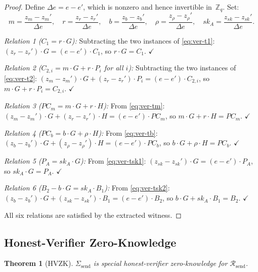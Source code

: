 \documentclass[11pt]{article}
\newtheorem{theorem}{Theorem}[section]
\theoremstyle{definition}
\newcommand{\Zq}{\mathbb{Z}_q}
\newcommand{\sk}{\mathit{sk}}
\begin{document}
\begin{proof}
  Define $\Delta e = e - e'$, which is nonzero and hence invertible
  in~$\Zq$.  Set:
  \[
    m = \frac{z_m - z_m'}{\Delta e},\quad
    r = \frac{z_r - z_r'}{\Delta e},\quad
    b = \frac{z_b - z_b'}{\Delta e},\quad
    \rho = \frac{z_\rho - z_\rho'}{\Delta e},\quad
    \sk_A = \frac{z_{\sk} - z_{\sk}'}{\Delta e}.
  \]

  \medskip\noindent\textit{Relation 1 ($C_1 = r \cdot G$):}
  Subtracting the two instances of \cref{eq:ver-t1}:
  $(z_r - z_r') \cdot G = (e - e') \cdot C_1$,
  so $r \cdot G = C_1$. $\checkmark$

  \medskip\noindent\textit{Relation 2 ($C_{2,i} = m \cdot G + r \cdot P_i$ for all $i$):}
  Subtracting the two instances of \cref{eq:ver-t2}:
  $(z_m - z_m') \cdot G + (z_r - z_r') \cdot P_i = (e - e') \cdot C_{2,i}$,
  so $m \cdot G + r \cdot P_i = C_{2,i}$. $\checkmark$

  \medskip\noindent\textit{Relation 3 ($\mathit{PC}_m = m \cdot G + r \cdot H$):}
  From \cref{eq:ver-tm}:
  $(z_m - z_m') \cdot G + (z_r - z_r') \cdot H = (e - e') \cdot \mathit{PC}_m$,
  so $m \cdot G + r \cdot H = \mathit{PC}_m$. $\checkmark$

  \medskip\noindent\textit{Relation 4 ($\mathit{PC}_b = b \cdot G + \rho \cdot H$):}
  From \cref{eq:ver-tb}:
  $(z_b - z_b') \cdot G + (z_\rho - z_\rho') \cdot H = (e - e') \cdot \mathit{PC}_b$,
  so $b \cdot G + \rho \cdot H = \mathit{PC}_b$. $\checkmark$

  \medskip\noindent\textit{Relation 5 ($P_A = \sk_A \cdot G$):}
  From \cref{eq:ver-tsk1}:
  $(z_{\sk} - z_{\sk}') \cdot G = (e - e') \cdot P_A$,
  so $\sk_A \cdot G = P_A$. $\checkmark$

  \medskip\noindent\textit{Relation 6 ($B_2 - b \cdot G = \sk_A \cdot B_1$):}
  From \cref{eq:ver-tsk2}:
  $(z_b - z_b') \cdot G + (z_{\sk} - z_{\sk}') \cdot B_1
   = (e - e') \cdot B_2$,
  so $b \cdot G + \sk_A \cdot B_1 = B_2$. $\checkmark$

  All six relations are satisfied by the extracted witness.
\end{proof}

\subsection{Honest-Verifier Zero-Knowledge}

\begin{theorem}[HVZK]
  \label{thm:hvzk}
  $\Sigma_{\mathrm{send}}$ is special honest-verifier zero-knowledge
  for $\mathcal{R}_{\mathrm{send}}$.
\end{theorem}
\end{document}
